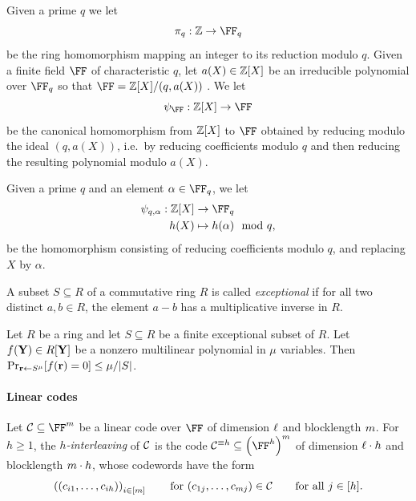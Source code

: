 \documentclass[11pt,letterpaper,usenames,dvipsnames]{article}
\begin{document}







Given a prime $q$ we let $$\pi_q: \ZZ\to \FF_q$$ be the ring homomorphism mapping an integer to its reduction modulo $q$. Given a  finite field $\FF$ of characteristic $q$, let $a(X)\in \mathbb{Z}[X]$ be an irreducible polynomial over $\FF_q$ so that $\FF = \ZZ[X]/(q,a(X))$ . We let $$\psi_{\FF}: \ZZ[X] \to \FF$$ be the  canonical homomorphism from $\mathbb{Z}[X]$ to $\FF$ obtained by reducing modulo the ideal $(q,a(X))$, i.e.\ by reducing coefficients modulo $q$ and then reducing the resulting polynomial modulo $a(X)$.

Given a prime $q$ and an element $\alpha\in \FF_q$, we let
%
\begin{align*}
    \psi_{q,\alpha} : \ZZ[X] &\to \FF_q\\ 
    h(X) &\mapsto h(\alpha) \mod q,
\end{align*}
be the homomorphism consisting of reducing coefficients modulo $q$, and replacing $X$ by $\alpha$.


A subset $S\subseteq R$ of a commutative ring $R$ is called \emph{exceptional} if for all two distinct $a,b\in R$, the element $a-b$ has a multiplicative inverse in $R$.
\begin{lemma}
\label{lem:sz_exceptional_sets}
Let $R$ be a ring and let $S\subseteq R$ be a finite exceptional subset of $R$. Let $f(\mathbf{Y})\in R[\mathbf{Y}]$ be a nonzero multilinear polynomial in $\mu$ variables. Then
$\Pr_{\mathbf{r}\gets S^\mu}[f(\mathbf{r})=0] \le \mu/|S|$.
\end{lemma}


\paragraph{Linear codes}

Let $\cC \subseteq \FF^{\codelength}$ be a linear code over $\FF$ of dimension $\ell$ and blocklength $m$. For $h\geq 1$, the \emph{$h$-interleaving} of $\mathcal{C}$ is the code $\cC^{\equiv h} \subseteq \left(\FF^{h}\right)^{\codelength}$ of dimension $\ell\cdot h$ and blocklength $m\cdot h$, whose codewords have the form $$\left((c_{i1},\ldots, c_{ih})\right)_{i\in [m]} \qquad \text{for } (c_{1j},\ldots, c_{m j})\in \mathcal{C} \qquad \text{for all } j\in [h].$$
\end{document}
